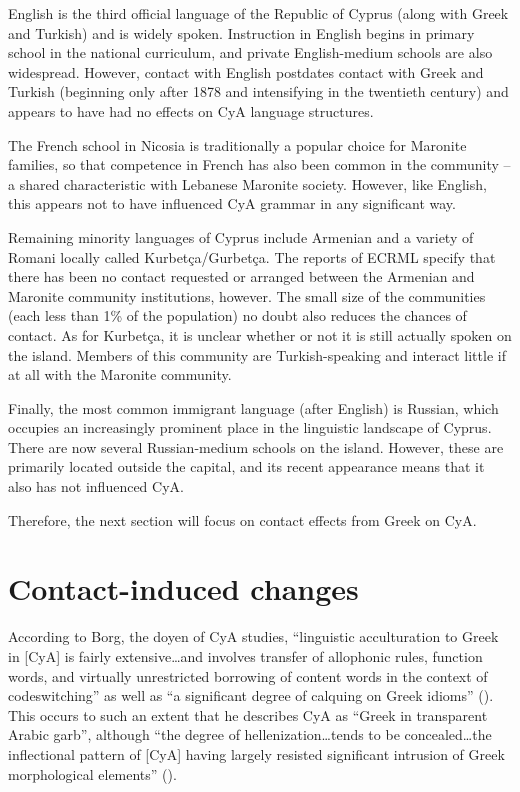\documentclass[output=paper]{langsci/langscibook}
\begin{document}
English is the third official language of the Republic of Cyprus (along with Greek and Turkish) and is widely spoken. Instruction in English begins in primary school in the national curriculum, and private English-medium schools are also widespread. However, contact with English postdates contact with Greek and Turkish (beginning only after 1878 and intensifying in the twentieth century) and appears to have had no effects on CyA language structures. 

The French school in Nicosia is traditionally a popular choice for Maronite families, so that competence in French has also been common in the community – a shared characteristic with Lebanese Maronite society. However, like English, this appears not to have influenced CyA grammar in any significant way. 

Remaining minority languages of Cyprus include Armenian and a variety of Romani locally called Kurbetça/Gurbetça. The reports of ECRML specify that there has been no contact requested or arranged between the Armenian and Maronite community institutions, however. The small size of the communities (each less than 1\% of the population) no doubt also reduces the chances of contact. As for Kurbetça, it is unclear whether or not it is still actually spoken on the island. Members of this community are Turkish-speaking and interact little if at all with the Maronite community.

Finally, the most common immigrant language (after English) is Russian, which occupies an increasingly prominent place in the linguistic landscape of Cyprus. There are now several Russian-medium schools on the island. However, these are primarily located outside the capital, and its recent appearance means that it also has not influenced CyA. 

Therefore, the next section will focus on contact effects from Greek on CyA.

\section{Contact-induced changes}
According to Borg, the doyen of CyA studies, “linguistic acculturation to Greek in [CyA] is fairly extensive…and involves transfer of allophonic rules, function words, and virtually unrestricted borrowing of content words in the context of codeswitching” as well as “a significant degree of calquing on Greek idioms” (\citeyear[64]{Borg2004}). This occurs to such an extent that he describes CyA as “Greek in transparent Arabic garb”, although “the degree of hellenization…tends to be concealed…the inflectional pattern of [CyA] having largely resisted significant intrusion of Greek morphological elements” (\citeyear[65]{Borg2004}).
\end{document}

